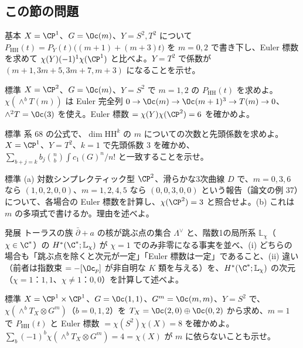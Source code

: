 \subsection*{この節の問題}
\begin{prob}{基本}\label{p:Y1}
$X=\CP^1$、$G=\Oc(m)$、$Y=S^2,T^2$ について $P_{\mathrm{HH}}(t)=P_Y(t)\bigl((m+1)+(m+3)t\bigr)$ を $m=0,2$ で書き下し、Euler 標数を求めて $\chi(Y)(-1)^1\chi(\CP^1)$ と比べよ。$Y=T^2$ で係数が $(m+1,3m+5,3m+7,m+3)$ になることを示せ。
\end{prob}
\begin{prob}{標準}\label{p:Y2}
$X=\CP^2$、$G=\Oc(m)$、$Y=S^2$ で $m=1,2$ の $P_{\mathrm{HH}}(t)$ を求めよ。$\chi(\wedge^bT(m))$ は Euler 完全列 $0\to\Oc(m)\to\Oc(m+1)^3\to T(m)\to0$、$\wedge^2T=\Oc(3)$ を使え。Euler 標数 $=\chi(Y)\chi(\CP^2)=6$ を確かめよ。
\end{prob}
\begin{prob}{標準}\label{p:Y3}
系 68 の公式で、$\dim\mathrm{HH}^k$ の $m$ についての次数と先頭係数を求めよ。$X=\CP^1$、$Y=T^2$、$k=1$ で先頭係数 $3$ を確かめ、$\sum_{b+j=k}b_j\binom nb\int c_1(G)^n/n!$ と一致することを示せ。
\end{prob}
\begin{prob}{標準}\label{p:Y4}
(a) 対数シンプレクティック型 $\CP^2$、滑らかな3次曲線 $D$ で、$m=0,3,6$ なら $(1,0,2,0,0)$、$m=1,2,4,5$ なら $(0,0,3,0,0)$ という報告（論文の例 37）について、各場合の Euler 標数を計算し、$\chi(\CP^2)=3$ と照合せよ。(b) これは $m$ の多項式で書けるか。理由を述べよ。
\end{prob}
\begin{prob}{発展}\label{p:Y5}
トーラスの族 $\bar\partial+a$ の核が跳ぶ点の集合 $\Lambda^\vee$ と、階数1の局所系 $\mathbb L_\chi$（$\chi\in\C^*$）の $H^*(\C^*;\mathbb L_\chi)$ が $\chi=1$ でのみ非零になる事実を並べ、(i) どちらの場合も「跳ぶ点を除くと次元が一定」「Euler 標数は一定」であること、(ii) 違い（前者は指数束 $=-[\Oc_p]$ が非自明な $K$ 類を与える）を、$H^*(\C^*;\mathbb L_\chi)$ の次元（$\chi=1$：$1,1$、$\chi\ne1$：$0,0$）を計算して述べよ。
\end{prob}
\begin{prob}{標準}\label{p:Y6}
$X=\CP^1\times\CP^1$、$G=\Oc(1,1)$、$G^m=\Oc(m,m)$、$Y=S^2$ で、$\chi(\wedge^bT_X\otimes G^m)$（$b=0,1,2$）を $T_X=\Oc(2,0)\oplus\Oc(0,2)$ から求め、$m=1$ で $P_{\mathrm{HH}}(t)$ と Euler 標数 $=\chi(S^2)\chi(X)=8$ を確かめよ。$\sum_b(-1)^b\chi(\wedge^bT_X\otimes G^m)=4=\chi(X)$ が $m$ に依らないことも示せ。
\end{prob}
